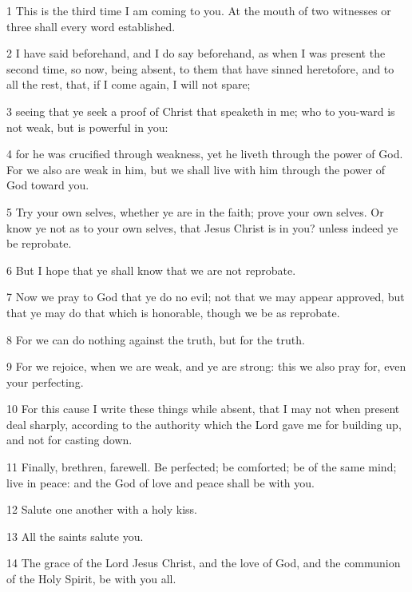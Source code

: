 \par 1 This is the third time I am coming to you. At the mouth of two witnesses or three shall every word established.
\par 2 I have said beforehand, and I do say beforehand, as when I was present the second time, so now, being absent, to them that have sinned heretofore, and to all the rest, that, if I come again, I will not spare;
\par 3 seeing that ye seek a proof of Christ that speaketh in me; who to you-ward is not weak, but is powerful in you:
\par 4 for he was crucified through weakness, yet he liveth through the power of God. For we also are weak in him, but we shall live with him through the power of God toward you.
\par 5 Try your own selves, whether ye are in the faith; prove your own selves. Or know ye not as to your own selves, that Jesus Christ is in you? unless indeed ye be reprobate.
\par 6 But I hope that ye shall know that we are not reprobate.
\par 7 Now we pray to God that ye do no evil; not that we may appear approved, but that ye may do that which is honorable, though we be as reprobate.
\par 8 For we can do nothing against the truth, but for the truth.
\par 9 For we rejoice, when we are weak, and ye are strong: this we also pray for, even your perfecting.
\par 10 For this cause I write these things while absent, that I may not when present deal sharply, according to the authority which the Lord gave me for building up, and not for casting down.
\par 11 Finally, brethren, farewell. Be perfected; be comforted; be of the same mind; live in peace: and the God of love and peace shall be with you.
\par 12 Salute one another with a holy kiss.
\par 13 All the saints salute you.
\par 14 The grace of the Lord Jesus Christ, and the love of God, and the communion of the Holy Spirit, be with you all.

